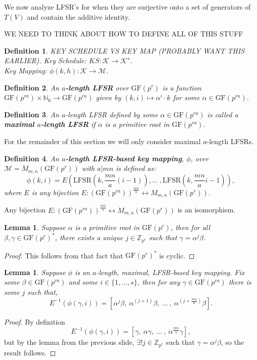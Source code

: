 \documentclass[11pt]{amsart}
\newcommand{\naturals}{{\mathbb N}}
\newcommand{\ZZ}{\mathbb{Z}}
\newcommand{\KK}{\mathcal{K}}
\newcommand{\MM}{\mathcal{M}}
\newcommand{\GF}{\mathrm{GF}}
\newcommand{\LFSR}{\text{LFSR}}
\newtheorem{definition}{{\bf Definition}}
\newtheorem{lemma}[theorem]{{\bf Lemma }}
\begin{document}
We now analyze LFSR's for when they are surjective onto a set of generators of $T(V)$ and contain the additive identity.

WE NEED TO THINK ABOUT HOW TO DEFINE ALL OF THIS STUFF \

\begin{definition}
KEY SCHEDULE VS KEY MAP (PROBABLY WANT THIS EARLIER). 
Key Schedule: $KS: \KK \rightarrow \KK^s$. \\
Key Mapping: $\phi (k,h): \KK \rightarrow \MM$.
\end{definition}

\begin{definition}
An {\bf $a$-length LFSR} over $\GF(p^r)$ is a function $\GF(p^{ra}) \times \naturals_{0} \rightarrow \GF(p^{ra})$ given by $(k,i) \mapsto \alpha^i \cdot k$ for some $\alpha \in \GF(p^{ra})$.
\end{definition}

\begin{definition}
An $a$-length LFSR defined by some $\alpha \in \GF(p^{ra})$ is called a {\bf maximal $a$-length LFSR} if $\alpha$ is a primitive root in $\GF(p^{ra})$.
\end{definition}

For the remainder of this section we will only consider maximal $a$-length LFSRs.

\begin{definition}
An {\bf $a$-length LFSR-based key mapping}, $\phi$, over $\MM=M_{m,n}(\GF(p^{r}))$ with $a | mn$ is defined as:
\[
\phi(k,i) = E \left(\LFSR(k,\frac{mn}{a}(i-1)), \dots ~,\LFSR(k, \frac{mn}{a}i - 1) \right),
\]
where $E$ is any bijection $E: (\GF(p^{ra}))^{\frac{mn}{a}} \leftrightarrow M_{m,n}(\GF(p^r))$.
\end{definition}

Any bijection $E: (\GF(p^{ra}))^{\frac{mn}{a}} \leftrightarrow M_{m,n}(\GF(p^r))$ is an isomorphism.

\begin{lemma}
Suppose $\alpha$ is a primitive root in $\GF(p^r)$, then for all $\beta, \gamma \in \GF(p^r)^*$, there exists a unique $j \in \ZZ_{p^r}$ such that $\gamma = \alpha^j \beta$.
\end{lemma}
\begin{proof}
This follows from that fact that $\GF(p^r)^*$ is cyclic.
\end{proof}

\begin{lemma}
Suppose $\phi$ is an $a$-length, maximal, LFSR-based key mapping. Fix some $\beta \in \GF(p^{ra})$ and some $i \in \{ 1,\dots,s \}$, then for any $\gamma \in \GF(p^{ra})$ there is some $j$ such that,
\[
E^{-1}(\phi(\gamma,i)) = \left[ \alpha^j \beta, ~ \alpha^{(j+1)} \beta, ~  \dots ~, ~ \alpha^{(j+ \frac{mn}{a})} \beta \right].
\]
\end{lemma}
\begin{proof}
By definition
\[
E^{-1}(\phi(\gamma,i)) = \left[ \gamma, ~ \alpha \gamma, ~  \dots ~, ~ \alpha^{\frac{mn}{a}} \gamma \right],
\]
but by the lemma from the previous slide, $\exists ! j \in \ZZ_{p^r}$ such that $\gamma = \alpha^j \beta$, so the result follows.
\end{proof}
\end{document}
